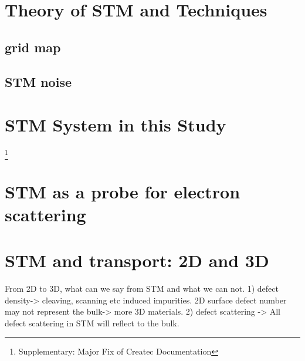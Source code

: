 \section{Theory of STM and Techniques}
\subsection{grid map}
\subsection{STM noise}
\section{STM System in this Study}
\footnote{Supplementary: Major Fix of Createc Documentation}
\section{STM as a probe for electron scattering}

\section{STM and transport: 2D and 3D}
From 2D to 3D, what can we say from STM and what we can not. 
1) defect density-> cleaving, scanning etc induced impurities. 2D surface defect number may not represent the bulk-> more 3D materials. 
2) defect scattering -> All defect scattering in STM will reflect to the bulk. 
